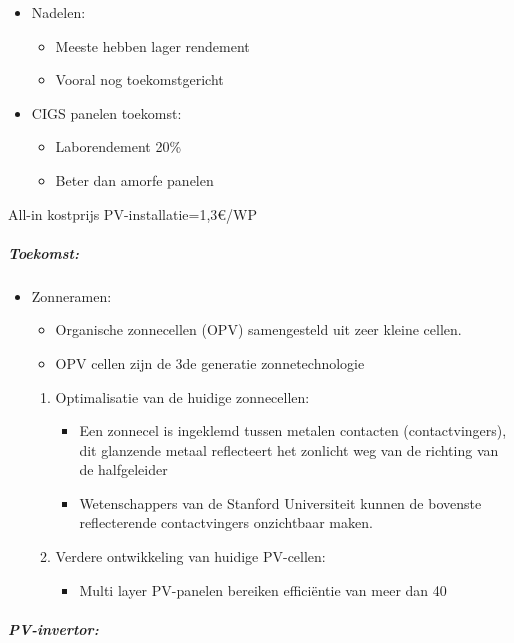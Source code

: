 \documentclass[12pt]{article}
\begin{document}
\begin{itemize}
\begin{itemize}
        \item Nadelen:\begin{itemize}
            \item Meeste hebben lager rendement 
            \item Vooral nog toekomstgericht
        \end{itemize}
        \item CIGS panelen toekomst:\begin{itemize}
            \item Laborendement 20\%
            \item Beter dan amorfe panelen            
        \end{itemize}
    \end{itemize}
\end{itemize}
All-in kostprijs PV-installatie=1,3€/WP
\subparagraph{Toekomst:}
\begin{itemize}
    \item Zonneramen:\begin{itemize}
        \item Organische zonnecellen (OPV) samengesteld uit zeer kleine cellen.
        \item OPV cellen zijn de 3de generatie zonnetechnologie
    \end{itemize}
    \begin{enumerate}
        \item Optimalisatie van de huidige zonnecellen:\begin{itemize}
            \item Een zonnecel is ingeklemd tussen metalen contacten (contactvingers), dit glanzende metaal reflecteert het zonlicht weg van de richting van de halfgeleider
            \item Wetenschappers van de Stanford Universiteit kunnen de bovenste
            reflecterende contactvingers onzichtbaar maken.
        \end{itemize}
        \item Verdere ontwikkeling van huidige PV-cellen:\begin{itemize}
            \item Multi layer PV-panelen bereiken efficiëntie van meer dan 40 %
        \end{itemize}
    \end{enumerate}
\end{itemize}
\subparagraph{PV-invertor:}
\end{document}

